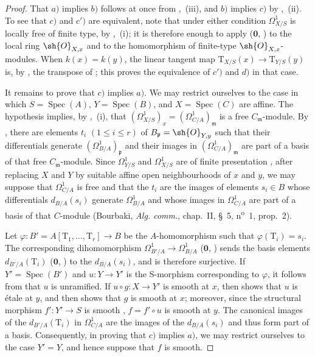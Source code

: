 \begin{proof}
That $a)$ implies $b)$ follows at once from ,~(iii), and $b)$ implies $c)$ by ,~(ii).
To see that $c)$ and $c')$ are equivalent, note that under either condition $\Omega^1_{X/S}$ is locally free of finite type, by ,~(i); it is therefore enough to apply ($\mathbf{0}$, ) to the local ring $\sh{O}_{X,x}$ and to the homomorphism  of finite-type $\sh{O}_{X,x}$-modules.
When $k(x)=k(y)$, the linear tangent map $\mathrm{T}_{X/S}(x)\to\mathrm{T}_{Y/S}(y)$ is, by , the transpose of ; this proves the equivalence of $c')$ and $d)$ in that case.

It remains to prove that $c)$ implies $a)$.
We may restrict ourselves to the case in which $S=\operatorname{Spec}(A)$, $Y=\operatorname{Spec}(B)$, and $X=\operatorname{Spec}(C)$ are affine.
The hypothesis implies, by ,~(i), that
$(\Omega^1_{X/S})_x=(\Omega^1_{C/A})_{\mathfrak m}$ is a free $C_{\mathfrak m}$-module.
By , there are elements $t_i$ $(1\leq i\leq r)$ of
$B_{\mathfrak p}=\sh{O}_{Y,y}$ such that their differentials generate
$(\Omega^1_{B/A})_{\mathfrak p}$ and their images in
$(\Omega^1_{C/A})_{\mathfrak m}$ are part of a basis of that free $C_{\mathfrak m}$-module.
Since $\Omega^1_{Y/S}$ and $\Omega^1_{X/S}$ are of finite presentation , after replacing $X$ and $Y$ by suitable affine open neighbourhoods of $x$ and $y$, we may suppose that $\Omega^1_{C/A}$ is free and that the $t_i$ are the images of elements $s_i\in B$ whose differentials $d_{B/A}(s_i)$ generate $\Omega^1_{B/A}$ and whose images in $\Omega^1_{C/A}$ are part of a basis of that $C$-module (Bourbaki, \emph{Alg. comm.}, chap.~II, \S~5, n\textsuperscript{o}~1, prop.~2).

Let $\varphi:B'=A[\mathrm{T}_1,\ldots,\mathrm{T}_r]\to B$ be the $A$-homomorphism such that $\varphi(\mathrm{T}_i)=s_i$.
The corresponding dihomomorphism
$\Omega^1_{B'/A}\to\Omega^1_{B/A}$ ($\mathbf{0}$, ) sends the basis elements $d_{B'/A}(\mathrm{T}_i)$ ($\mathbf{0}$, ) to the $d_{B/A}(s_i)$, and is therefore surjective.
If $Y'=\operatorname{Spec}(B')$ and $u:Y\to Y'$ is the S-morphism corresponding to $\varphi$, it follows from  that $u$ is unramified.
If $u\circ g:X\to Y'$ is smooth at $x$, then  shows that $u$ is \'etale at $y$, and  then shows that $g$ is smooth at $x$; moreover, since the structural morphism $f':Y'\to S$ is smooth , $f=f'\circ u$ is smooth at $y$.
The canonical images of the $d_{B'/A}(\mathrm{T}_i)$ in $\Omega^1_{C/A}$ are the images of the $d_{B/A}(s_i)$ and thus form part of a basis.
Consequently, in proving that $c)$ implies $a)$, we may restrict ourselves to the case $Y'=Y$, and hence suppose that $f$ is smooth.


\end{proof}
